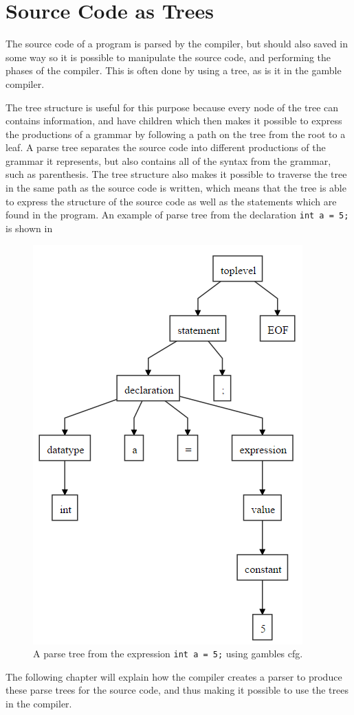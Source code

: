 \section{Source Code as Trees}\label{SourceCodeAsTrees}
The source code of a program is parsed by the compiler, but should also saved in some way so it is possible to manipulate the source code, and performing the phases of the compiler.
This is often done by using a tree, as is it in the \gls{gamble} compiler.

The tree structure is useful for this purpose because every node of the tree can contains information, and have children which then makes it possible to express the productions of a grammar by following a path on the tree from the root to a leaf.
A parse tree separates the source code into different productions of the grammar it represents, but also contains all of the syntax from the grammar, such as parenthesis.
The tree structure also makes it possible to traverse the tree in the same path as the source code is written, which means that the tree is able to express the structure of the source code as well as the statements which are found in the program.
An example of parse tree from the declaration \texttt{int a = 5;} is shown in 

\begin{figure}
    \centering
    \includegraphics[width=0.5\linewidth]{figures/Trees/PST.PNG}
    \caption{A parse tree from the expression \texttt{int a = 5;} using \glspl{gamble} \acrshort{cfg}.} \label{image:PST}
\end{figure}

The following chapter will explain how the compiler creates a parser to produce these parse trees for the source code, and thus making it possible to use the trees in the compiler.
